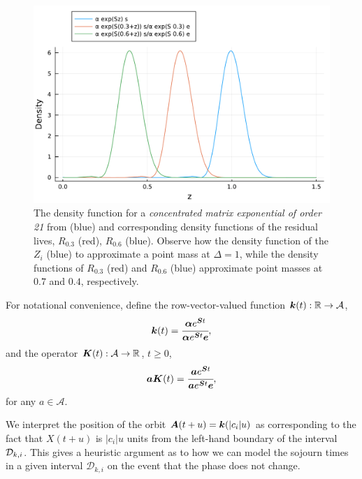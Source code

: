 \begin{figure}
\centering
\includegraphics[width=\textwidth]{chapter2/figs/ME_residual_life_density.pdf}
\caption{The density function for a \emph{concentrated matrix exponential of order 21} from \citep{hht2020} (blue) and corresponding density functions of the residual lives, \(R_{0.3}\) (red), \(R_{0.6}\) (blue). Observe how the density function of the \(Z_i\) (blue) to approximate a point mass at \(\Delta=1\), while the density functions of \(R_{0.3}\) (red) and \(R_{0.6}\) (blue) approximate point masses at \(0.7\) and \(0.4\), respectively. }
\label{fig:residual distributions}
\end{figure}

For notational convenience, define the row-vector-valued function \(\boldsymbol k(t):\mathbb R\to \mathcal A\), 
\begin{equation}
	\boldsymbol k(t) = \cfrac{\boldsymbol \alpha e^{\boldsymbol S t}}{\boldsymbol \alpha e^{\boldsymbol S t}\boldsymbol e}, \label{eqn: orbit fun def}
\end{equation}
and the operator \(\boldsymbol K(t): \mathcal A\to \mathbb R\), \(t\geq 0\), 
\begin{equation}
	\boldsymbol a \boldsymbol K(t) = \cfrac{\boldsymbol a e^{\boldsymbol S t}}{\boldsymbol a e^{\boldsymbol S t}\boldsymbol e}, \label{eqn: operator fun def}
\end{equation}
for any \(a\in\mathcal A\). 

We interpret the position of the orbit \(\boldsymbol A(t+u) = \boldsymbol k(|c_i|u)\) as corresponding to the fact that \(X(t+u)\) is \(|c_i|u\) units from the left-hand boundary of the interval \(\mathcal{D}_{k,i}\). This gives a heuristic argument as to how we can model the sojourn times in a given interval \(\mathcal D_{k,i}\) on the event that the phase does not change. 

